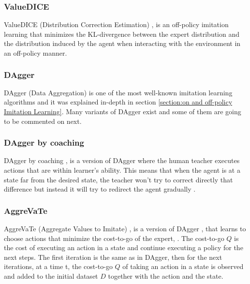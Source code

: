 \subsubsection*{ValueDICE}
ValueDICE (Distribution Correction Estimation) \cite{ValueDICE-Kostrikov:2019}, is an off-policy imitation learning \cite{Laskey:phdthesis} that minimizes the KL-divergence between the expert distribution and the distribution induced by the agent when interacting with the environment in an off-policy manner.


\subsubsection*{DAgger}
DAgger (Data Aggregation) \cite{DAgger-Ross:2011} is one of the most well-known imitation learning algorithms and it was explained in-depth in section \ref{section:on and off-policy Imitation Learning}. Many variants of DAgger exist and some of them are going to be commented on next.



\subsubsection*{DAgger by coaching}
DAgger by coaching \cite{DAgger-by-coaching-He-DaumeIII-Eisner:2012},  is a version of DAgger \cite{DAgger-Ross:2011} where the human teacher executes actions that are within learner’s ability. This means that when the agent is at a state far from the desired state, the teacher won't try to correct directly that difference but instead it will try to redirect the agent gradually \cite{Global-overview-Attia:2018}.


\subsubsection*{AggreVaTe}
AggreVaTe (Aggregate Values to Imitate) \cite{AggreVaTe-Ross-Bagnell:2014}, is a version of DAgger \cite{DAgger-Ross:2011}, that learns to choose actions that minimize the cost-to-go of the expert, 
\cite{Global-overview-Attia:2018}. The cost-to-go $Q$ is the cost of executing an action in a state and continue executing a policy for the next steps. The first iteration is the same as in DAgger, then for the next iterations,  at a time t, the cost-to-go $Q$ of taking an action in a state is observed and added to the initial dataset $D$ together with the action and the state.




